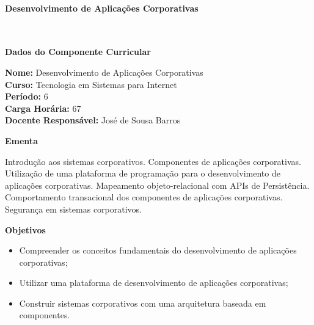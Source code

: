 \paragraph{Desenvolvimento de Aplicações Corporativas} \


\begin{snugshade}\begin{center}\textbf{
	Dados do Componente Curricular
}\end{center}\end{snugshade}

\noindent 	\textbf{Nome:} Desenvolvimento de Aplicações Corporativas
\\ 			\textbf{Curso:} Tecnologia em Sistemas para Internet
\\ 			\textbf{Período:} \unit{6}{\degree}
\\ 			\textbf{Carga Horária:} \unit{67}{\hour}
\\ 			\textbf{Docente Responsável:} José de Sousa Barros 


\begin{snugshade}\begin{center}\textbf{
    Ementa
\vphantom{q}}\end{center}\end{snugshade}

\noindent
Introdução aos sistemas corporativos. Componentes de aplicações corporativas.  Utilização de uma plataforma de programação para o desenvolvimento de aplicações corporativas. Mapeamento objeto-relacional com APIs de Persistência. Comportamento transacional dos componentes de aplicações corporativas. Segurança em sistemas corporativos.



\begin{snugshade}\begin{center}\textbf{
    Objetivos
}\end{center}\end{snugshade}


\begin{itemize}

\item Compreender os conceitos fundamentais do desenvolvimento de aplicações corporativas;
\item Utilizar uma plataforma de desenvolvimento de aplicações corporativas;
\item Construir sistemas corporativos com uma arquitetura baseada em componentes.

\end{itemize}

